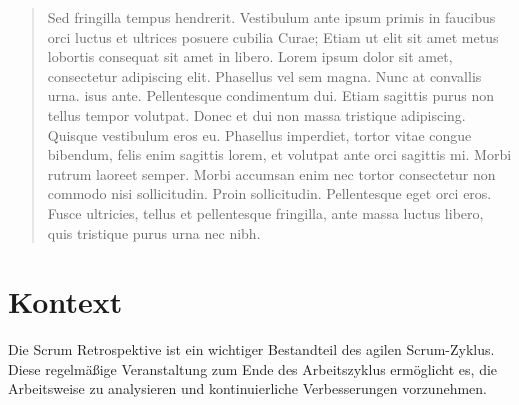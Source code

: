 \documentclass[a0,landscape]{a0poster}
\begin{document}
\vspace{1cm} %


\begin{multicols}{4} %


    \color{Navy} %

    \begin{abstract}

        Sed fringilla tempus hendrerit. Vestibulum ante ipsum primis in faucibus orci luctus et ultrices posuere cubilia Curae; Etiam ut elit sit amet metus lobortis consequat sit amet in libero. Lorem ipsum dolor sit amet, consectetur adipiscing elit. Phasellus vel sem magna. Nunc at convallis urna. isus ante. Pellentesque condimentum dui. Etiam sagittis purus non tellus tempor volutpat. Donec et dui non massa tristique adipiscing. Quisque vestibulum eros eu. Phasellus imperdiet, tortor vitae congue bibendum, felis enim sagittis lorem, et volutpat ante orci sagittis mi. Morbi rutrum laoreet semper. Morbi accumsan enim nec tortor consectetur non commodo nisi sollicitudin. Proin sollicitudin. Pellentesque eget orci eros. Fusce ultricies, tellus et pellentesque fringilla, ante massa luctus libero, quis tristique purus urna nec nibh.

    \end{abstract}


    \color{SaddleBrown} %

    \section*{Kontext}

    Die Scrum Retrospektive ist ein wichtiger Bestandteil des agilen Scrum-Zyklus. Diese regelmäßige Veranstaltung zum Ende des Arbeitszyklus ermöglicht es, die Arbeitsweise zu analysieren und kontinuierliche Verbesserungen vorzunehmen.


\end{multicols}
\end{document}
